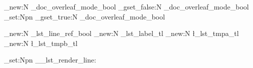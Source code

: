 
\usepackage[english]{babel}
\usepackage{metalogo}
\usepackage{tcolorbox}
\usepackage{booktabs}
\usepackage{microtype}
\usepackage{expl3}
\usepackage{mdframed}
\usepackage{chngcntr}
\usepackage{etoolbox}
\usepackage{adjustbox}
\usepackage{supertabular}
\usepackage{makecell}
\usepackage{tikz}
\usepackage{ragged2e}
\usepackage{float}
\usepackage{array}
\usepackage{xcolor}
\usepackage{datetime2}
\usepackage{listings}
\usepackage{xsimverb}
\usepackage[scale=0.9]{tgheros}

\ExplSyntaxOn

\bool_new:N \g_doc_overleaf_mode_bool
\bool_gset_false:N \g_doc_overleaf_mode_bool
\cs_set:Npn \UseOverleafMode
{
    \bool_gset_true:N \g_doc_overleaf_mode_bool
}
\ExplSyntaxOff


\usepackage[breaklinks]{hyperref}
\usepackage[capitalise]{cleveref}



\newcommand*{\LT}{\texorpdfstring{\LaTeX}{LaTeX}}
\newcommand*{\LTT}{\texorpdfstring{\LaTeX3}{LaTeX3}}
\let\liii\LTT


\newcommand{\ListOfCodeExampleName}{List of Examples}
\makeatletter
\newcommand{\ListOfCodeExample}{\section*{\ListOfCodeExampleName}\@starttoc{CodeExample}}
\makeatother


\makeatletter
\ExplSyntaxOn
\bool_new:N \g_lst_line_ref_bool
\tl_new:N \g_lst_label_tl
\tl_new:N \l_lst_tmpa_tl
\tl_new:N \l_lst_tmpb_tl

\newcommand{\SetLstRefLabel}[1]{\tl_gset:Nn \g_lst_label_tl {#1}}


\cs_set:Npn \__lst_render_line: {
    \textcolor[rgb]{0.5,0.5,0.5}{
    \ttfamily\scriptsize
    }
}

